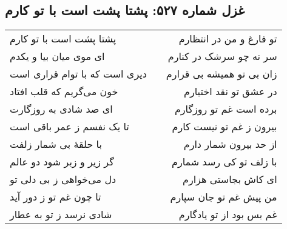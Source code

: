 \begin{center}
\section*{غزل شماره ۵۲۷: پشتا پشت است با تو کارم}
\label{sec:527}
\begin{longtable}{l p{0.5cm} r}
پشتا پشت است با تو کارم
&&
تو فارغ و من در انتظارم
\\
ای موی میان بیا و یکدم
&&
سر نه چو سرشک در کنارم
\\
دیری است که با توام قراری است
&&
زان بی تو همیشه بی قرارم
\\
خون می‌گریم که قلب افتاد
&&
در عشق تو نقد اختیارم
\\
ای صد شادی به روزگارت
&&
برده است غم تو روزگارم
\\
تا یک نفسم ز عمر باقی است
&&
بیرون ز غم تو نیست کارم
\\
با حلقهٔ بی شمار زلفت
&&
از حد بیرون شمار دارم
\\
گر زیر و زبر شود دو عالم
&&
با زلف تو کی رسد شمارم
\\
دل می‌خواهی ز بی دلی تو
&&
ای کاش بجاستی هزارم
\\
تا چون غم تو ز دور آید
&&
من پیش غم تو جان سپارم
\\
شادی نرسد ز تو به عطار
&&
غم بس بود از تو یادگارم
\\
\end{longtable}
\end{center}
